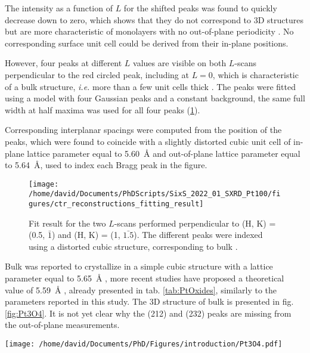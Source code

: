 The intensity as a function of $L$ for the shifted peaks was found to quickly decrease down to zero, which shows that they do not correspond to 3D structures but are more characteristic of monolayers with no out-of-plane periodicity \parencite{Robinson1991}.
No corresponding surface unit cell could be derived from their in-plane positions.

However, four peaks at different $L$ values are visible on both $L$-scans perpendicular to the red circled peak, including at $L=0$, which is characteristic of a bulk structure, \textit{i.e.} more than a few unit cells thick \parencite{Robinson1991}.
The peaks were fitted using a model with four Gaussian peaks and a constant background, the same full width at half maxima was used for all four peaks (\ref{fig:FitPt100LScans}).

Corresponding interplanar spacings were computed from the position of the peaks, which were found to coincide with a slightly distorted cubic unit cell of in-plane lattice parameter equal to \qty{5.60}{\angstrom} and out-of-plane lattice parameter equal to \qty{5.64}{\angstrom}, used to index each Bragg peak in the figure.

\begin{figure}[!htb]
    \centering
    \texttt{[image: /home/david/Documents/PhDScripts/SixS\_2022\_01\_SXRD\_Pt100/figures/ctr\_reconstructions\_fitting\_result]}
    \caption{
        Fit result for the two $L$-scans performed perpendicular to (H, K) = (0.5, $\bar{1}$) and (H, K) = (1, $\bar{1.5}$).
        The different peaks were indexed using a distorted cubic structure, corresponding to bulk .
    }
    \label{fig:FitPt100LScans}
\end{figure}

Bulk  was reported to crystallize in a simple cubic structure with a lattice parameter equal to \qty{5.65}{\angstrom} \parencite{Galloni1941, Galloni1952, MULLER1968}, more recent studies have proposed a theoretical value of \qty{5.59}{\angstrom} \parencite{Seriani2006}, already presented in tab. \ref{tab:PtOxides}, similarly to the parameters reported in this study.
The 3D structure of bulk  is presented in fig. \ref{fig:Pt3O4}.
It is not yet clear why the (212) and (232) peaks are missing from the out-of-plane measurements.

\begin{SCfigure}
    \centering
    \texttt{[image: /home/david/Documents/PhD/Figures/introduction/Pt3O4.pdf]}
    \caption{
         bulk unit cell.
        Platinum atoms are situated on the faces on the cubic unit cell (e.g. $(0, 1/2, 1/4)$, $(0, 1/2, 3/4)$), while the eight oxygen atoms are inside the unit cell at the positions $(1/4, 1/4, z)$, $(1/4, 2/4, z)$, $(2/4, 1/4, z)$, $(2/4, 2/4, z)$ for $z=1/4$ and $z=3/4$.
    }
    \label{fig:Pt3O4}
\end{SCfigure}

